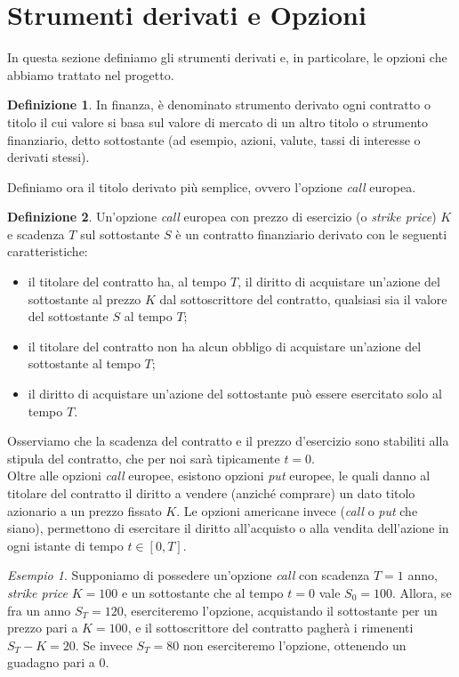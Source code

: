 \documentclass[a4paper,10pt]{report}
\theoremstyle{plain}
\theoremstyle{definition}
\newtheorem{definition}{Definizione}[chapter]
\theoremstyle{remark}
\newtheorem{esempio}{Esempio}%
\begin{document}
\section{Strumenti derivati e Opzioni}
In questa sezione definiamo gli strumenti derivati e, in particolare, le opzioni che abbiamo trattato nel progetto.
\begin{definition}
In finanza, \`e denominato strumento derivato ogni contratto o titolo il cui valore si basa sul valore di mercato di un altro titolo o strumento finanziario, detto sottostante (ad esempio, azioni, valute, tassi di interesse o derivati stessi).
\end{definition}
Definiamo ora il titolo derivato pi\`u semplice, ovvero l'opzione \emph{call} europea.
\begin{definition}
Un'opzione \emph{call} europea con prezzo di esercizio (o \emph{strike price}) $K$ e scadenza $T$ sul sottostante $S$ \`e un contratto finanziario derivato con le seguenti caratteristiche:
\begin{itemize}
\item il titolare del contratto ha, al tempo $T$, il diritto di acquistare un'azione del sottostante al prezzo $K$ dal sottoscrittore del contratto, qualsiasi sia il valore del sottostante $S$ al tempo $T$;
\item il titolare del contratto non ha alcun obbligo di acquistare un'azione del sottostante al tempo $T$;
\item il diritto di acquistare un'azione del sottostante pu\`o essere esercitato solo al tempo $T$.
\end{itemize}
\end{definition}
Osserviamo che la scadenza del contratto e il prezzo d'esercizio sono stabiliti alla stipula del contratto, che per noi sar\`a tipicamente $t=0$.\\Oltre alle opzioni \emph{call} europee, esistono opzioni \emph{put} europee, le quali danno al titolare del contratto il diritto a vendere (anzich\'e comprare) un dato titolo azionario a un prezzo fissato $K$. Le opzioni americane invece (\emph{call} o \emph{put} che siano), permettono di esercitare il diritto all'acquisto o alla vendita dell'azione in ogni istante di tempo $t\in[0,T]$.
\begin{esempio}
Supponiamo di possedere un'opzione \emph{call} con scadenza $T=1$ anno, \emph{strike price} $K=100$\officialeuro$ $ e un sottostante che al tempo $t=0$ vale $S_0=100$\officialeuro. Allora, se fra un anno $S_T=120$\officialeuro$ $, eserciteremo l'opzione, acquistando il sottostante per un prezzo pari a $K=100$\officialeuro$ $, e il sottoscrittore del contratto pagher\`a i rimenenti $S_T-K=20$\officialeuro$ $. Se invece $S_T=80$\officialeuro$ $ non eserciteremo l'opzione, ottenendo un guadagno pari a 0.
\end{esempio}
\end{document}
